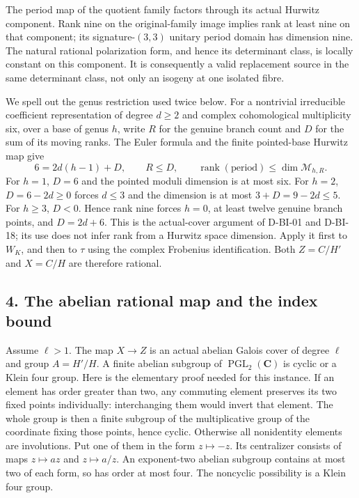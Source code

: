 The period map of the quotient family factors through its actual
Hurwitz component.  Rank nine on the original-family image implies
rank at least nine on that component; its signature-$(3,3)$
unitary period domain has dimension nine.  The natural rational
polarization form, and hence its determinant class, is locally
constant on this component.  It is consequently a valid replacement
source in the same determinant class, not only an isogeny at one
isolated fibre.

We spell out the genus restriction used twice below.  For a nontrivial
irreducible coefficient representation of degree $d\ge2$ and
complex cohomological multiplicity six, over a base of genus $h$,
write $R$ for the genuine branch count and $D$ for the sum of its
moving ranks.  The Euler formula and the finite pointed-base
Hurwitz map give
\[
 6=2d(h-1)+D,
 \qquad R\le D,
 \qquad \operatorname{rank}(\mathrm{period})
       \le\dim\mathcal M_{h,R}.
 \tag{NID.13}
\]
For $h=1$, $D=6$ and the pointed moduli dimension is at most six.
For $h=2$, $D=6-2d\ge0$ forces $d\le3$ and the dimension is at
most $3+D=9-2d\le5$.  For $h\ge3$, $D<0$.
Hence rank nine forces $h=0$, at least twelve genuine branch
points, and $D=2d+6$.  This is the actual-cover argument of
D-BI-01 and D-BI-18; its use does not infer rank from a Hurwitz
space dimension.  Apply it first to $W_K$, and then to $\tau$
using the complex Frobenius identification.  Both $Z=C/H'$ and
$X=C/H$ are therefore rational.

\subsection*{4. The abelian rational map and the index bound}

Assume $\ell>1$.  The map $X\to Z$ is an actual abelian
Galois cover of degree $\ell$ and group $A=H'/H$.
A finite abelian subgroup of $\operatorname{PGL}_2(\mathbf C)$
is cyclic or a Klein four group.  Here is the elementary proof
needed for this instance.  If an element has order greater than
two, any commuting element preserves its two fixed points
individually: interchanging them would invert that element.
The whole group is then a finite subgroup of the multiplicative
group of the coordinate fixing those points, hence cyclic.
Otherwise all nonidentity elements are involutions.  Put one of
them in the form $z\mapsto-z$.  Its centralizer consists of maps
$z\mapsto az$ and $z\mapsto a/z$.  An exponent-two abelian
subgroup contains at most two of each form, so has order at most
four.  The noncyclic possibility is a Klein four group.

